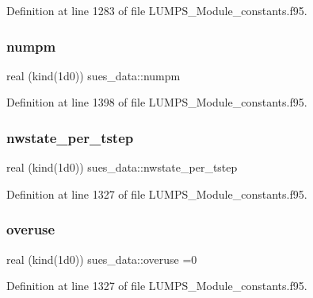 Definition at line 1283 of file L\+U\+M\+P\+S\+\_\+\+Module\+\_\+constants.\+f95.

\mbox{\label{namespacesues__data_a06a4500745768a4bcf4886312a028e0c}} 
\subsubsection{\texorpdfstring{numpm}{numpm}}
{\footnotesize\ttfamily real (kind(1d0)) sues\+\_\+data\+::numpm}



Definition at line 1398 of file L\+U\+M\+P\+S\+\_\+\+Module\+\_\+constants.\+f95.

\mbox{\label{namespacesues__data_a9a093b62067234bd553e776c06ac4df9}} 
\subsubsection{\texorpdfstring{nwstate\+\_\+per\+\_\+tstep}{nwstate\_per\_tstep}}
{\footnotesize\ttfamily real (kind(1d0)) sues\+\_\+data\+::nwstate\+\_\+per\+\_\+tstep}



Definition at line 1327 of file L\+U\+M\+P\+S\+\_\+\+Module\+\_\+constants.\+f95.

\mbox{\label{namespacesues__data_aa663cd30d361709a541de0a9d406557e}} 
\subsubsection{\texorpdfstring{overuse}{overuse}}
{\footnotesize\ttfamily real (kind(1d0)) sues\+\_\+data\+::overuse =0}



Definition at line 1327 of file L\+U\+M\+P\+S\+\_\+\+Module\+\_\+constants.\+f95.

\mbox{\label{namespacesues__data_a9ddcc1842e650815dfc06fa4a3bf6a78}} 
